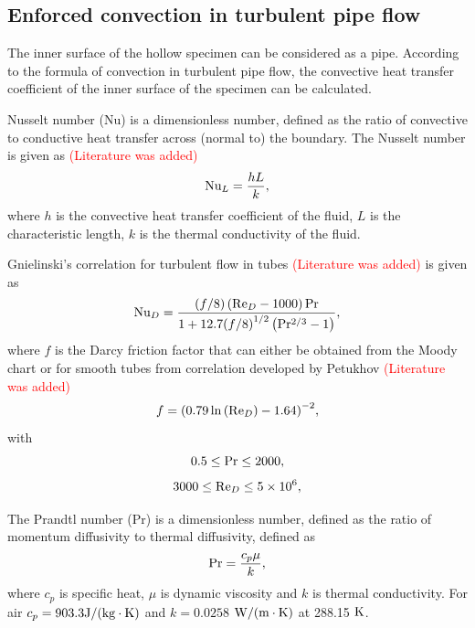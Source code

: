 \documentclass[preprint,5p,twocolumn,10pt,sort&compress]{elsarticle}
\newcommand{\marked}[1]{\textcolor{red}{#1}}
\begin{document}
\subsection{Enforced convection in turbulent pipe flow}
The inner surface of the hollow specimen can be considered as a pipe.
According to the formula of convection in turbulent pipe flow, the convective heat transfer coefficient of the inner surface of the specimen can be calculated.

Nusselt number (Nu) is a dimensionless number, defined as the ratio of convective to conductive heat transfer across (normal to) the boundary.
The Nusselt number is given as \cite{Bergman2017} \marked{(Literature was added)}
\begin{equation}
{\rm{N}}{{\rm{u}}_L} = \frac{{hL}}{k},
\end{equation}
where $h$ is the convective heat transfer coefficient of the fluid, $L$ is the characteristic length, $k$ is the thermal conductivity of the fluid.

Gnielinski's correlation for turbulent flow in tubes \cite{Gnielinski1975} \marked{(Literature was added)} is given as
\begin{equation}
{\rm{N}}{{\rm{u}}_D} = \frac{{\left( {f/8} \right)\left( {{\rm{R}}{{\rm{e}}_D} - 1000} \right){\rm{Pr}}}}{{1 + 12.7{{(f/8)}^{1/2}}\left( {{\rm{P}}{{\rm{r}}^{2/3}} - 1} \right)}},
\end{equation}
where $f$ is the Darcy friction factor that can either be obtained from the Moody chart or for smooth tubes from correlation developed by Petukhov \cite{Bergman2017} \marked{(Literature was added)}
\begin{equation}
f = {\left( {0.79\ln \left( {{\rm{R}}{{\rm{e}}_D}} \right) - 1.64} \right)^{ - 2}},
\end{equation}
with
\begin{equation}
0.5 \le {\rm{Pr}} \le 2000,
\end{equation}
\begin{equation}
3000 \le {\rm{R}}{{\rm{e}}_D} \le 5 \times {10^6},
\end{equation}

The Prandtl number (Pr) is a dimensionless number, defined as the ratio of momentum diffusivity to thermal diffusivity, defined as
\begin{equation}
{\rm{Pr}} = \frac{{{c_p}\mu }}{k},
\end{equation}
where
$c_{p}$ is specific heat, $\mu$ is dynamic viscosity and $k$ is thermal conductivity. For air $c_{p}=903.3 {\rm{J/(kg}} \cdot {\rm{K}})$ and $k=0.0258$ ${\rm{W/(m}} \cdot {\rm{K}})$ at 288.15 ${\rm{K}}$.
\end{document}
